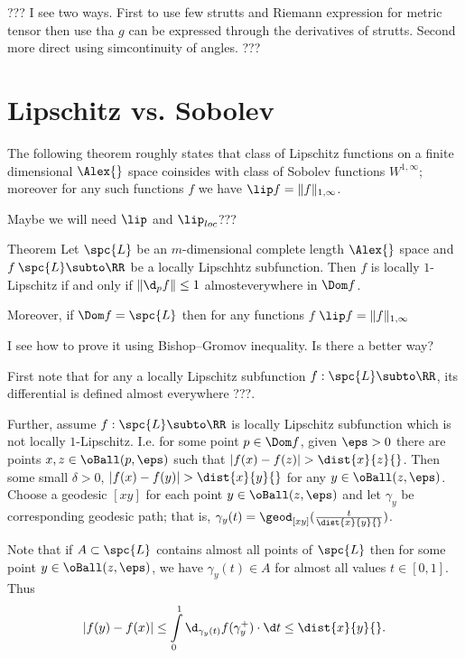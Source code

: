 ??? I see two ways. First to use few strutts and Riemann expression for metric tensor then use tha $g$ can be expressed through the derivatives of strutts.
Second more direct using  simcontinuity of angles.
???
\qeds












\section{Lipschitz vs. Sobolev}

The following theorem roughly states that class of Lipschitz functions on a finite dimensional $\Alex{}$ space 
coinsides with class of Sobolev functions $W^{1,\infty}$;
moreover for any such functions $f$ we have $\lip f=\|f\|_{1,\infty}$. 

Maybe we will need $\lip$ and $\lip_{loc}$???

\begin{thm}{Theorem}
Let $\spc{L}$ be an $m$-dimensional complete length $\Alex{}$ space and $f\:\spc{L}\subto\RR$ be a locally Lipschhtz subfunction.
Then $f$ is locally $1$-Lipschitz if and only if $\|\d_pf\|\le1$ almosteverywhere in $\Dom f$.

Moreover, if $\Dom f=\spc{L}$ then for any functions $f$
$\lip f=\|f\|_{1,\infty}$
\end{thm}

 I see how to prove it using Bishop--Gromov inequality.
Is there a better way?

First note that for any a locally Lipschitz subfunction $f:\spc{L}\subto\RR$,
its differential is defined almost everywhere ???.

Further, assume $f:\spc{L}\subto\RR$ is locally Lipschitz subfunction which is not locally $1$-Lipschitz.
I.e. for some point $p\in \Dom f$, given $\eps>0$ there are points $x,z\in\oBall(p,\eps)$ such that $|f(x)-f(z)|>\dist{x}{z}{}$.
Then some small $\delta>0$,
$|f(x)-f(y)|>\dist{x}{y}{}$
for any $y\in\oBall(z,\eps)$.
Choose a geodesic $[xy]$ for each point $y\in\oBall(z,\eps)$
and let $\gamma_y$ be corresponding geodesic path;
that is, $\gamma_y(t)=\geod_{[x y]}(\tfrac{t}{\dist{x}{y}{}})$.

Note that if $A\subset \spc{L}$ contains almost all points of $\spc{L}$ then for some point $y\in\oBall(z,\eps)$, we have $\gamma_y(t)\in A$ for almost all values $t\in[0,1]$.
Thus 
\[|f(y)-f(x)|
\le
\int\limits_0^1\d_{\gamma_y(t)}f(\gamma_y^+)\cdot\d t
\le
\dist{x}{y}{}.\]

